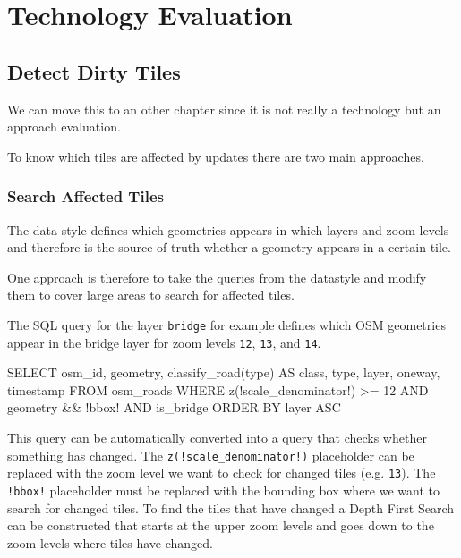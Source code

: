 \chapter{Technology Evaluation}\label{technology_evaluation}


\section{Detect Dirty Tiles}\label{detect_dirty_tiles}

\begin{tcolorbox}[arc=0mm,boxrule=1pt,title=Note]
We can move this to an other chapter since it is not really a technology
but an approach evaluation.
\end{tcolorbox}

To know which tiles are affected by updates there are two main approaches.

\subsection{Search Affected Tiles}

The data style defines which geometries appears in which layers and zoom levels and 
therefore is the source of truth whether a geometry appears in a certain tile.

One approach is therefore to take the queries from the datastyle and modify
them to cover large areas to search for affected tiles.

The SQL query for the layer \texttt{bridge} for example defines which 
OSM geometries appear in the bridge layer for zoom levels \texttt{12}, \texttt{13}, and \texttt{14}.

\begin{sqlcode}
SELECT osm_id, geometry, classify_road(type) AS class, type, layer, oneway, timestamp
FROM osm_roads
WHERE z(!scale_denominator!) >= 12 
AND geometry && !bbox! 
AND is_bridge
ORDER BY layer ASC
\end{sqlcode}

This query can be automatically converted into a query that checks whether something has changed.
The \texttt{z(!scale\_denominator!)} placeholder can be replaced with the zoom level
we want to check for changed tiles (e.g. \texttt{13}).
The \texttt{!bbox!} placeholder must be replaced with the bounding box where we want to search
for changed tiles. To find the tiles that have changed a Depth First Search can be constructed
that starts at the upper zoom levels and goes down to the zoom levels where tiles have changed.

